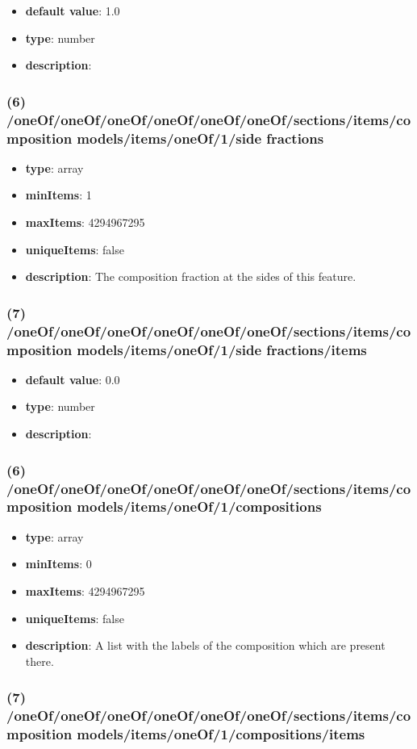 \begin{itemize}[leftmargin=7em]\item {\bf default value}: 1.0
\item {\bf type}: number
\item {\bf description}: 
\end{itemize}\subsubsection{(6) /oneOf/oneOf/oneOf/oneOf/oneOf/oneOf/sections/items/composition models/items/oneOf/1/side fractions}
\begin{itemize}[leftmargin=6em]\item {\bf type}: array
\item {\bf minItems}: 1
\item {\bf maxItems}: 4294967295
\item {\bf uniqueItems}: false
\item {\bf description}: The composition fraction at the sides of this feature.
\end{itemize}\subsubsection{(7) /oneOf/oneOf/oneOf/oneOf/oneOf/oneOf/sections/items/composition models/items/oneOf/1/side fractions/items}
\begin{itemize}[leftmargin=7em]\item {\bf default value}: 0.0
\item {\bf type}: number
\item {\bf description}: 
\end{itemize}\subsubsection{(6) /oneOf/oneOf/oneOf/oneOf/oneOf/oneOf/sections/items/composition models/items/oneOf/1/compositions}
\begin{itemize}[leftmargin=6em]\item {\bf type}: array
\item {\bf minItems}: 0
\item {\bf maxItems}: 4294967295
\item {\bf uniqueItems}: false
\item {\bf description}: A list with the labels of the composition which are present there.
\end{itemize}\subsubsection{(7) /oneOf/oneOf/oneOf/oneOf/oneOf/oneOf/sections/items/composition models/items/oneOf/1/compositions/items}
